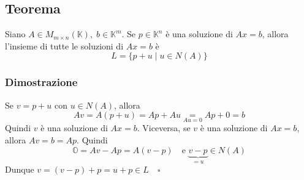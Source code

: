 \documentclass[a4paper]{article}
\theoremstyle{break}
\theoremstyle{break}
\theoremstyle{break}
\theoremstyle{break}
\begin{document}
\subsection{Teorema}
Siano \( A \in M_{m \times n}(\mathbb{K}),\; b \in \mathbb{K}^m \). Se \( p \in \mathbb{K}^n \) 
è una soluzione di \( Ax = b \), allora l'insieme di tutte le soluzioni di \( Ax = b \) è
\[
L = \{p + u \;|\; u \in N(A)\} 
\] 

\subsubsection{Dimostrazione}
Se \( v = p + u \) con \( u \in  N(A) \), allora 
\[
  Av = A(p+u) = Ap + Au \underset{Au = 0}{=} Ap + 0 = b
\]
Quindi \( v \) è una soluzione di \( Ax = b \). Viceversa, se \( v \) è una soluzione
di \( Ax = b \), allora \( Av = b = Ap \). Quindi
\[
  \mathbb{O} = Av - Ap = A(v-p) \quad \text{e } \underbrace{v-p}_{=u} \in N(A)
\] 
Dunque \( v = (v-p) + p = u + p \in L \quad \square \) 
\end{document}
